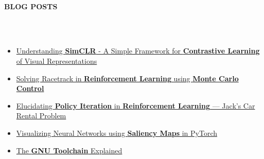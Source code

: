 \documentclass[a4,10pt]{book}
\newcommand{\lsep}{-0.57cm}
\newcommand{\resheading}[1]{{\small \colorbox{mygrey}{\begin{minipage}{0.975\textwidth}{\textbf{#1 \vphantom{p\^{E}}}}\end{minipage}}}}
\begin{document}
\hspace{0.5cm}\\[-0.2cm]
\resheading{\textbf{BLOG POSTS} }\\[\lsep]
\\[-0.5em]
\begin{itemize}	
	\item 
	\href{https://medium.com/analytics-vidhya/understanding-simclr-a-simple-framework-for-contrastive-learning-of-visual-representations-d544a9003f3c?source=friends_link&sk=e768e4c2a88bd7d33f8eb42072b1fb05}{Understanding\textbf{ SimCLR} - A Simple Framework for \textbf{Contrastive Learning} of Visual Representations}
	\\[\lsep]
	\item 
	\href{https://towardsdatascience.com/solving-racetrack-in-reinforcement-learning-using-monte-carlo-control-bdee2aa4f04e?source=friends_link&sk=926f05a3660c6bf4d8c6a81be77645c5}{Solving Racetrack in \textbf{Reinforcement Learning} using \textbf{Monte Carlo Control}}
	\\[\lsep]
	\item
	\href{https://towardsdatascience.com/elucidating-policy-iteration-in-reinforcement-learning-jacks-car-rental-problem-d41b34c8aec7?source=friends_link&sk=6d58e79a8c87eb8396724901306312ac}{Elucidating \textbf{Policy Iteration} in \textbf{Reinforcement Learning} — Jack’s Car Rental Problem}
	\\[\lsep]
	\item 
	\href{https://medium.com/datadriveninvestor/visualizing-neural-networks-using-saliency-maps-in-pytorch-289d8e244ab4?source=friends_link&sk=37de912972716f67b3acab5c9bcdd9b0}{Visualizing Neural Networks using \textbf{Saliency Maps} in PyTorch}
	\\[\lsep]
	\item 
	\href{https://medium.com/swlh/the-gnu-toolchain-explained-4bf14666bc03?source=friends_link&sk=4b9c4214e37b2b38d98e8f79edc824fe}{The \textbf{GNU Toolchain} Explained}
\end{itemize}
\end{document}
